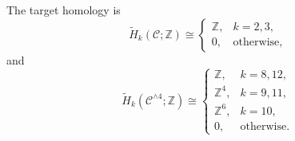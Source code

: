 \begin{theorem}
The target homology is
\begin{equation}
 \widetilde H_k(\mathcal C;\mathbb Z)\cong
 \begin{cases}
  \mathbb Z,&k=2,3,\\
  0,&\text{otherwise},
 \end{cases}
 \label{wb:cusp-cone-C-homology}
\end{equation}
and
\begin{equation}
 \widetilde H_k(\mathcal C^{\wedge4};\mathbb Z)\cong
 \begin{cases}
  \mathbb Z,&k=8,12,\\
  \mathbb Z^4,&k=9,11,\\
  \mathbb Z^6,&k=10,\\
  0,&\text{otherwise}.
 \end{cases}
 \label{wb:cusp-cone-C-smash-homology}
\end{equation}
\end{theorem}



